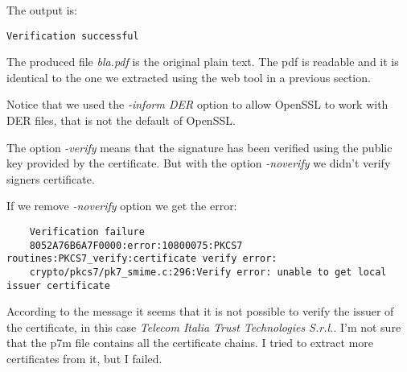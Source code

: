 \documentclass{article}
\begin{document}
\noindent The output is: 
\begin{verbatim}
Verification successful
\end{verbatim}

The produced file \emph{bla.pdf} is the original plain text.
The pdf is readable and it is identical to the one we extracted using the web tool
in a previous section.

Notice that we used the \emph{-inform DER} option to allow OpenSSL to work with DER files,
that is not the default of OpenSSL.

The option \emph{-verify} means that the signature has been verified using the public key
provided by the certificate. But with the option \emph{-noverify} we didn't verify signers certificate.

\noindent If we remove \emph{-noverify} option we get the error:
\begin{tiny}
\begin{verbatim}
	Verification failure
	8052A76B6A7F0000:error:10800075:PKCS7 routines:PKCS7_verify:certificate verify error:
	crypto/pkcs7/pk7_smime.c:296:Verify error: unable to get local issuer certificate
\end{verbatim}
\end{tiny}

According to the message it seems that it is not possible to verify the issuer of the certificate,
in this case \emph{Telecom Italia Trust Technologies S.r.l.}.
I'm not sure that the p7m file contains all the certificate chains.
I tried to extract more certificates from it, but I failed.
\end{document}
